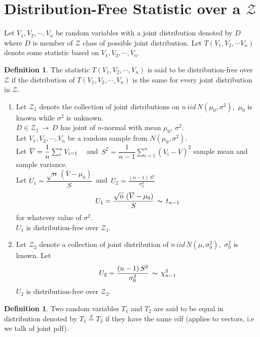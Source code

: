 \documentclass[12pt,a4paper]{report}
\theoremstyle{definition}
\newtheorem{defn}[thm]{Definition}
\theoremstyle{plain}
\begin{document}
\section{Distribution-Free Statistic over a $\mathscr{Z}$} 
Let $V_1, V_2, \cdots, V_n$ be random variables with a joint distribution denoted by $D$ where $D$ is member of $\mathscr{Z}$ class of possible joint distribution. Let $T(V_1, V_2, \cdots V_n)$ denote some statistic based on $V_1, V_2, \cdots , V_n.$

\begin{defn}
 The statistic $T(V_1, V_2, \cdots, V_n)$ is said to be distribution-free over $\mathscr{Z}$ if the distribution of $T(V_1, V_2, \cdots, V_n)$ is the same for every joint distribution in $\mathscr{Z}$.
\end{defn}

\begin{enumerate}
\item[(i)] Let $\mathscr{Z}_1$ denote the collection of joint distributions on $n\, iid\, N(\mu_0, \sigma^2)$, $\, \mu_0$ is known while $\sigma^2$ is unknown.\\

$D\in \mathscr{Z}_1\, \longrightarrow\, D$ has joint of $n$-normal with mean $\mu_0, \, \sigma^2$.\\

Let $V_1, V_2, \cdots, V_n$ be a random sample from $N(\mu_0, \sigma^2)$.\\

Let $\overline{V} = \dfrac{1}{n}\sum^n_i V_{i=1}\hspace{0.3cm}$ and $\, S^2 = \dfrac{1}{n - 1} \sum^n_{i = 1} (V_i - \overline{V})^2$ sample mean and sample variance.\\

Let $U_1 = \dfrac{\sqrt{n}\, (\overline{V} - \mu_0)}{S}\,$ and $\, U_2 = \frac{(n-1)\, S^2}{\sigma^2_0}$
$$U_1 = \frac{\sqrt{n}\,\, (\overline{V} - \mu_0)}{S} \, \thicksim \, t_{n-1}$$
for whatever value of $\sigma^2$.\\
$U_1$ is distribution-free over $\mathscr{Z}_1$.


\item[(ii)] Let $\mathscr{Z}_2$ denote a collection of joint distribution of $n\,  iid \, N(\mu, \sigma^2_0)$, $\, \sigma^2_0$ is known. Let 
$$U_2 = \frac{(n-1)\, S^2}{\sigma^2_0}\, \thicksim\, \chi^2_{n-1}$$
$U_2$ is distribution-free over $\mathscr{Z}_2$. 
\end{enumerate}


\begin{defn}
Two random variables $T_1$ and $T_2$ are said to be equal in distribution denoted by $T_1\overset{d}{=}T_2$  if they have the same cdf (applies to vectors, i.e we talk of joint pdf).
\end{defn}
 
\end{document}
